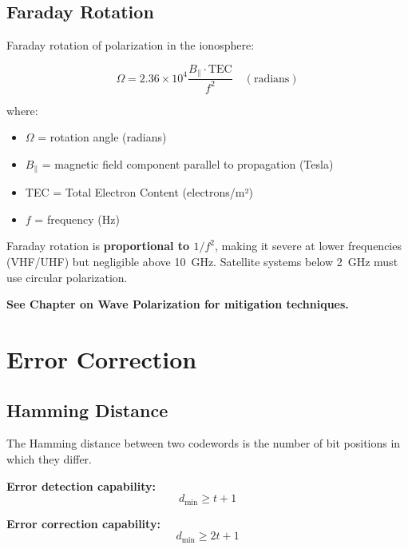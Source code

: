 \subsection{Faraday Rotation}
\label{subsec:faraday-rotation}

Faraday rotation of polarization in the ionosphere:

\begin{equation}
\label{eq:faraday-rotation}
\Omega = 2.36 \times 10^4 \frac{B_\parallel \cdot \text{TEC}}{f^2} \quad (\text{radians})
\end{equation}

where:
\begin{itemize}
\item $\Omega$ = rotation angle (radians)
\item $B_\parallel$ = magnetic field component parallel to propagation (Tesla)
\item TEC = Total Electron Content (electrons/m²)
\item $f$ = frequency (Hz)
\end{itemize}

\begin{importantbox}
Faraday rotation is \textbf{proportional to $1/f^2$}, making it severe at lower frequencies (VHF/UHF) but negligible above 10~GHz. Satellite systems below 2~GHz must use circular polarization.
\end{importantbox}

\textbf{See Chapter on Wave Polarization for mitigation techniques.}

\section{Error Correction}
\label{sec:error-correction}

\subsection{Hamming Distance}
\label{subsec:hamming-distance}

The Hamming distance between two codewords is the number of bit positions in which they differ.

\textbf{Error detection capability:}
\begin{equation}
\label{eq:hamming-detection}
d_{\min} \geq t + 1
\end{equation}

\textbf{Error correction capability:}
\begin{equation}
\label{eq:hamming-correction}
d_{\min} \geq 2t + 1
\end{equation}

